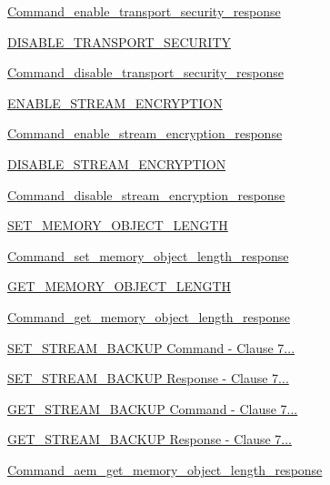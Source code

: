 \begin{DoxyCompactItemize}
\item 
\hyperlink{group__command__enable__transport__security__response}{Command\+\_\+enable\+\_\+transport\+\_\+security\+\_\+response}
\item 
\hyperlink{group__command__disable__transport__security}{D\+I\+S\+A\+B\+L\+E\+\_\+\+T\+R\+A\+N\+S\+P\+O\+R\+T\+\_\+\+S\+E\+C\+U\+R\+I\+TY}
\item 
\hyperlink{group__command__disable__transport__security__response}{Command\+\_\+disable\+\_\+transport\+\_\+security\+\_\+response}
\item 
\hyperlink{group__command__enable__stream__encryption}{E\+N\+A\+B\+L\+E\+\_\+\+S\+T\+R\+E\+A\+M\+\_\+\+E\+N\+C\+R\+Y\+P\+T\+I\+ON}
\item 
\hyperlink{group__command__enable__stream__encryption__response}{Command\+\_\+enable\+\_\+stream\+\_\+encryption\+\_\+response}
\item 
\hyperlink{group__command__disable__stream__encryption}{D\+I\+S\+A\+B\+L\+E\+\_\+\+S\+T\+R\+E\+A\+M\+\_\+\+E\+N\+C\+R\+Y\+P\+T\+I\+ON}
\item 
\hyperlink{group__command__disable__stream__encryption__response}{Command\+\_\+disable\+\_\+stream\+\_\+encryption\+\_\+response}
\item 
\hyperlink{group__command__set__memory__object__length}{S\+E\+T\+\_\+\+M\+E\+M\+O\+R\+Y\+\_\+\+O\+B\+J\+E\+C\+T\+\_\+\+L\+E\+N\+G\+TH}
\item 
\hyperlink{group__command__set__memory__object__length__response}{Command\+\_\+set\+\_\+memory\+\_\+object\+\_\+length\+\_\+response}
\item 
\hyperlink{group__command__get__memory__object__length}{G\+E\+T\+\_\+\+M\+E\+M\+O\+R\+Y\+\_\+\+O\+B\+J\+E\+C\+T\+\_\+\+L\+E\+N\+G\+TH}
\item 
\hyperlink{group__command__get__memory__object__length__response}{Command\+\_\+get\+\_\+memory\+\_\+object\+\_\+length\+\_\+response}
\item 
\hyperlink{group__command__set__stream__backup}{S\+E\+T\+\_\+\+S\+T\+R\+E\+A\+M\+\_\+\+B\+A\+C\+K\+U\+P Command -\/ Clause 7...}
\item 
\hyperlink{group__command__set__stream__backup__response}{S\+E\+T\+\_\+\+S\+T\+R\+E\+A\+M\+\_\+\+B\+A\+C\+K\+U\+P Response -\/ Clause 7...}
\item 
\hyperlink{group__command__get__stream__backup}{G\+E\+T\+\_\+\+S\+T\+R\+E\+A\+M\+\_\+\+B\+A\+C\+K\+U\+P Command -\/ Clause 7...}
\item 
\hyperlink{group__command__get__stream__backup__response}{G\+E\+T\+\_\+\+S\+T\+R\+E\+A\+M\+\_\+\+B\+A\+C\+K\+U\+P Response -\/ Clause 7...}
\item 
\hyperlink{group__command__aem__get__memory__object__length__response}{Command\+\_\+aem\+\_\+get\+\_\+memory\+\_\+object\+\_\+length\+\_\+response}
\end{DoxyCompactItemize}
